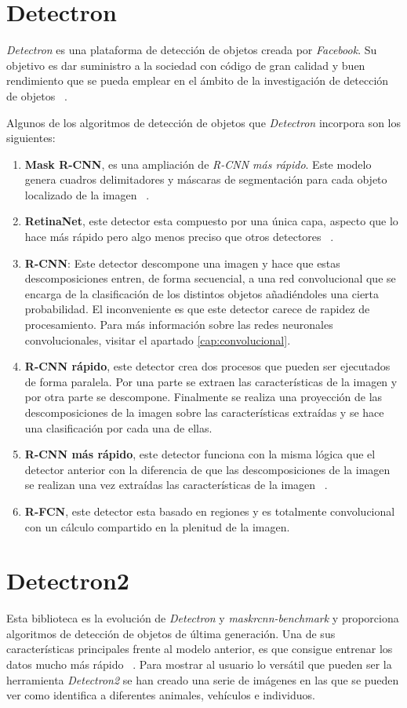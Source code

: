 \newpage
\section{Detectron}
\textit{Detectron} es una plataforma de detección de objetos creada por \textit{Facebook}. Su objetivo es dar suministro a la sociedad con código de gran calidad y buen rendimiento que se pueda emplear en el ámbito de la investigación de detección de objetos ~\cite{wiki:Detectron2018}.

Algunos de los algoritmos de detección de objetos que \textit{Detectron} incorpora son los siguientes:
\begin{enumerate}
    \item \textbf{Mask R-CNN}, es una ampliación de \textit{R-CNN más rápido}. Este modelo genera cuadros delimitadores y máscaras de segmentación para cada objeto localizado de la imagen ~\cite{dollar2017mask}.
    \item \textbf{RetinaNet}, este detector esta compuesto por una única capa, aspecto que lo hace más rápido pero algo menos preciso que otros detectores ~\cite{lin2017focal}.
    \item \textbf{R-CNN}: Este detector descompone una imagen y hace que estas descomposiciones entren, de forma secuencial, a una red convolucional que se encarga de la clasificación de los distintos objetos añadiéndoles una cierta probabilidad. El inconveniente es que este detector carece de rapidez de procesamiento. Para más información sobre las redes neuronales convolucionales, visitar el apartado \ref{cap:convolucional}. 
    \item \textbf{R-CNN rápido}, este detector crea dos procesos que pueden ser ejecutados de forma paralela. Por una parte se extraen las características de la imagen y por otra parte se descompone. Finalmente se realiza una proyección de las descomposiciones de la imagen sobre las características extraídas y se hace una clasificación por cada una de ellas.
    \item \textbf{R-CNN más rápido}, este detector funciona con la misma lógica que el detector anterior con la diferencia de que las descomposiciones de la imagen se realizan una vez extraídas las características de la imagen ~\cite{ren2015faster}. 
    \item \textbf{R-FCN}, este detector esta basado en regiones y es totalmente convolucional con un cálculo compartido en la plenitud de la imagen. 
\end{enumerate}

\section{Detectron2} \label{cap:Detectron2}
Esta biblioteca es la evolución de \textit{Detectron} y \textit{ maskrcnn-benchmark} y proporciona algoritmos de detección de objetos de última generación. Una de sus características principales frente al modelo anterior, es que consigue entrenar los datos mucho más rápido ~\cite{wu2019detectron2}. Para mostrar al usuario lo versátil que pueden ser la herramienta \textit{Detectron2} se han creado una serie de imágenes en las que se pueden ver como identifica a diferentes animales, vehículos e individuos. 

